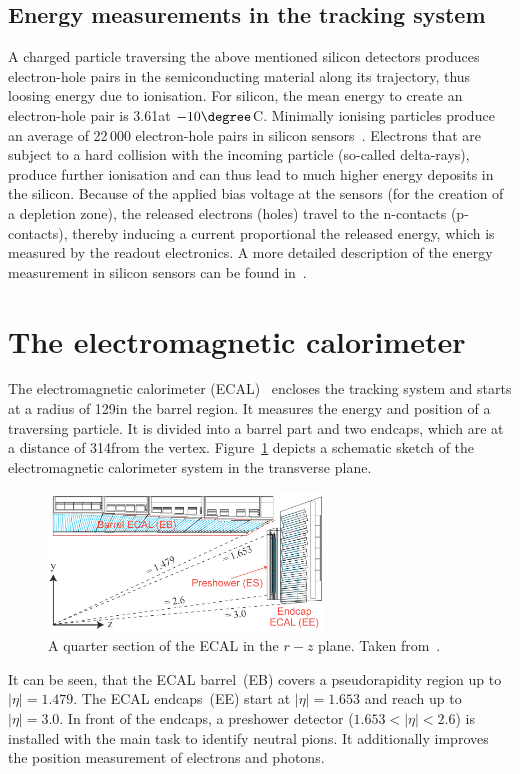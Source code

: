 \subsection*{Energy measurements in the tracking system}
A charged particle traversing the above mentioned silicon detectors produces electron-hole pairs in the semiconducting material along its trajectory, thus loosing energy due to ionisation.
For silicon, the mean energy to create an electron-hole pair is 3.61\ev at $-10\degree$C.
Minimally ionising particles produce an average of 22\,000 electron-hole pairs in silicon sensors~\cite{Thesis_Jenny}.
Electrons that are subject to a hard collision with the incoming particle (so-called delta-rays), produce further ionisation and can thus lead to much higher energy deposits in the silicon.
Because of the applied bias voltage at the sensors (for the creation of a depletion zone), the released electrons (holes) travel to the n-contacts (p-contacts), thereby inducing a current proportional the released energy, which is measured by the readout electronics. 
A more detailed description of the energy measurement in silicon sensors can be found in~\cite{Thesis_Jenny}.

\section{The electromagnetic calorimeter}
The electromagnetic calorimeter (ECAL)~\cite{bib:CMS:TDR_2006,bib:CMS:TDR_ECAL} encloses the tracking system and starts at a radius of 129\cm in the barrel region.
It measures the energy and position of a traversing particle.
It is divided into a barrel part and two endcaps, which are at a distance of 314\cm from the vertex.
Figure~\ref{fig:ECAL} depicts a schematic sketch of the electromagnetic calorimeter system in the transverse plane.
\begin{figure}[!t]
  \centering
      \includegraphics[width=0.65\textwidth]{figures/experiment/CMS/Figures_Experimental_Apparatus_ECALRapidity.png}
  \caption{A quarter section of the ECAL in the $r-z$ plane. Taken from~\cite{bib:CMS:TDR_2006}.}  
  \label{fig:ECAL}
\end{figure}
It can be seen, that the ECAL barrel~(EB) covers a pseudorapidity region up to $|\eta|=1.479$.
The ECAL endcaps~(EE) start at $|\eta|=1.653$ and reach up to $|\eta|=3.0$.
In front of the endcaps, a preshower detector ($1.653<|\eta|<2.6$) is installed with the main task to identify neutral pions.
It additionally improves the position measurement of electrons and photons.

